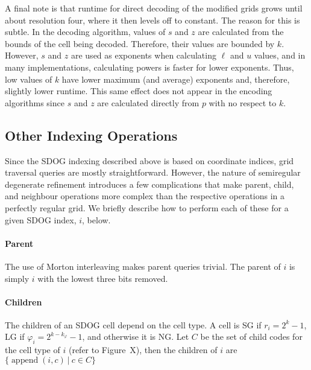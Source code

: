 A final note is that runtime for direct decoding of the modified grids grows until about resolution four, where it then levels off to constant.
The reason for this is subtle.
In the decoding algorithm, values of $s$ and $z$ are calculated from the bounds of the cell being decoded.
Therefore, their values are bounded by $k$.
However, $s$ and $z$ are used as exponents when calculating $\ell$ and $u$ values, and in many implementations, calculating powers is faster for lower exponents.
Thus, low values of $k$ have lower maximum (and average) exponents and, therefore, slightly lower runtime.
This same effect does not appear in the encoding algorithms since $s$ and $z$ are calculated directly from $p$ with no respect to $k$.


\subsection{Other Indexing Operations}
Since the SDOG indexing described above is based on coordinate indices, grid traversal queries are mostly straightforward.
However, the nature of semiregular degenerate refinement introduces a few complications that make parent, child, and neighbour operations more complex than the respective operations in a perfectly regular grid.
We briefly describe how to perform each of these for a given SDOG index, $i$, below.


\paragraph{Parent}
The use of Morton interleaving makes parent queries trivial. The parent of $i$ is simply $i$ with the lowest three bits removed.


\paragraph{Children}
The children of an SDOG cell depend on the cell type.
A cell is SG if $r_i = 2^k - 1$, LG if $\varphi_i = 2^{k - k_\varphi} - 1$, and otherwise it is NG.
Let $C$ be the set of child codes for the cell type of $i$ (refer to Figure~X), then the children of $i$ are $\{ \operatorname{append}(i, c) \ | \ c \in C \}$


